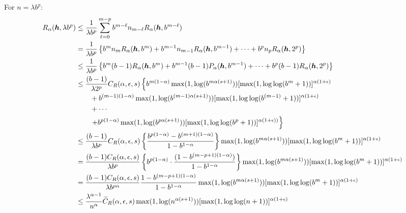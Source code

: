 \documentclass{amsart}
\begin{document}
For $n = \lambda b^p$:
\begin{align*}
    R_\alpha(\boldsymbol{h},\lambda b^p)
    & \le \frac {1}{\lambda b^p} \sum_{\ell = 0}^{m-p} b^{m-\ell} n_{m -\ell} R_\alpha(\boldsymbol{h},b^{m-\ell}) \\
    &= \frac {1}{\lambda b^p} \left\{b^m n_m R_\alpha(\boldsymbol{h},b^m) + b^{m-1} n_{m-1} R_\alpha(\boldsymbol{h},b^{m-1}) + \cdots + b^p n_p R_\alpha(\boldsymbol{h},2^p) 
    \right\} \\ 
    & \le \frac {1}{\lambda b^p} \left\{b^m (b-1) R_\alpha(\boldsymbol{h},b^m) + b^{m-1} (b-1) P_\alpha(\boldsymbol{h},b^{m-1}) + \cdots + b^p (b-1) R_\alpha(\boldsymbol{h},2^p) 
    \right\} \\ 
    & \le \frac {(b-1)}{\lambda 2^p} C_{R}(\alpha,\epsilon,s) \left\{ b^{m(1-\alpha)}\max(1, \log(b^{m\alpha(s+1)})) [\max(1,\log \log (
    b^m+1))]^{\alpha(1+\epsilon)}\right .\\ 
    & \qquad  + b^{(m-1)(1-\alpha)}\max(1, \log(b^{(m-1)\alpha(s+1)})) [\max(1,\log \log (
    b^{(m-1)}+1))]^{\alpha(1+\epsilon)}\\
      &  \qquad + \cdots \\
      & \qquad  \left . +   b^{p(1-\alpha)}\max(1,\log(b^{p\alpha(s+1)})) [\max(1,\log \log (b^p+1))]^{\alpha(1+\epsilon))}  \right\}\\
    & \le \frac {(b-1)}{\lambda b^p} C_{R}(\alpha,\epsilon,s) 
    \left\{\frac{b^{p(1-\alpha)} - b^{(m+1)(1- \alpha )}}{1 - b^{1 -\alpha}}\right\} \max(1, \log(b^{m\alpha(s+1)})) [\max(1,\log \log (
    b^m+1))]^{\alpha(1+\epsilon)} \\
    & = \frac { (b-1) C_{R}(\alpha,\epsilon,s)}{\lambda b^p} \left\{ b^{p(1-\alpha)} \cdot \frac{(1 - b^{(m-p+1)(1- \alpha )})}{1 - b^{1- \alpha}}\right\} 
     \max(1, \log(b^{m\alpha(s+1)})) [\max(1,\log \log (
    b^m+1))]^{\alpha(1+\epsilon)} \\
    &=  \frac {(b-1)C_{R}(\alpha,\epsilon,s)}{\lambda b^{p\alpha}}  \frac{1 - b^{(m-p+1)(1- \alpha )}}{1 - b^{1- \alpha}} \max(1, \log(b^{m\alpha(s+1)})) [\max(1,\log \log (
    b^m+1))]^{\alpha(1+\epsilon)} \\
    &\le \frac{\lambda^{\alpha -1}}{n^{\alpha}} \widetilde{C}_{R}(\alpha,\epsilon,s)  \max(1, \log(n^{\alpha(s+1)})) [\max(1,\log \log (
    n+1))]^{\alpha(1+\epsilon)} \\ 
\end{align*}


\end{document}
